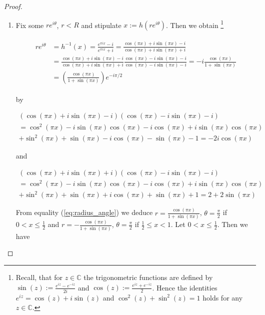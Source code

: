 \begin{proof}
\begin{enumerate}[label = \textbf{(\roman*)}]
\begin{enumerate}[label = \textbf{\alph*.}]
\item Fix some $re^{i\theta}$, $r < R$ and stipulate $x := h(re^{i\theta})$. Then we obtain \footnote{
		Recall, that for $z \in \mathbb{C}$ the trigonometric functions are defined by $\sin(z) := \frac{e^{iz} - e^{-iz}}{2i}$ and $\cos(z) := \frac{e^{iz} + e^{-iz}}{2}$. Hence the identities $e^{iz} = \cos(z) + i\sin(z)$ and $\cos^2(z) + \sin^2(z) = 1$ holds for any $z \in \mathbb{C}$.	
	}

	\begin{gather}
		\begin{aligned}
			re^{i\theta} &= h^{-1}(x) = \frac{e^{\pi i x}- i}{e^{\pi i x} + i} = \frac{\cos(\pi x) + i\sin(\pi x) - i}{\cos(\pi x) + i\sin(\pi x) + i}\\
			&= \frac{\cos(\pi x) + i\sin(\pi x) - i}{\cos(\pi x) + i\sin(\pi x) + i}\frac{\cos(\pi x) - i\sin(\pi x) - i}{\cos(\pi x) - i\sin(\pi x) - i} = -i \frac{\cos(\pi x)}{1 + \sin(\pi x)}\\
			&= \left( \frac{\cos(\pi x)}{1 + \sin(\pi x)} \right)e^{-i\pi/2}
		\end{aligned}
		\label{eq:radius_angle}
	\end{gather}

	by

	\begin{multline*}
			\left(\cos(\pi x) + i\sin(\pi x) - i\right)\left(\cos(\pi x) - i\sin(\pi x) - i\right)\\ = \cos^2(\pi x) - i\sin(\pi x)\cos(\pi x)	
			 -i\cos(\pi x) + i\sin(\pi x)\cos(\pi x)\\
			 + \sin^2(\pi x) + \sin(\pi x) - i \cos(\pi x) - \sin(\pi x) - 1 = -2i \cos(\pi x)  
	\end{multline*}

	and

	\begin{multline*}
		\left( \cos(\pi x) + i\sin(\pi x) + i \right)\left( \cos(\pi x) - i\sin(\pi x) - i \right)\\ = \cos^2(\pi x) - i\sin(\pi x)\cos(\pi x) - i\cos(\pi x) + i\sin(\pi x)\cos(\pi x)\\
		 + \sin^2(\pi x) + \sin(\pi x)+ i \cos(\pi x) + \sin(\pi x) + 1 = 2 + 2\sin(\pi x)
	\end{multline*}

	From equality (\ref{eq:radius_angle}) we deduce $r = \frac{\cos(\pi x)}{1 + \sin(\pi x)}$, $\theta = \frac{\pi}{2}$ if $0 < x \leqslant \frac{1}{2}$ and $r = -\frac{\cos(\pi x)}{1 + \sin(\pi x)}$, $\theta = \frac{\pi}{2}$ if $\frac{1}{2} \leqslant x < 1$. Let $0 < x \leqslant \frac{1}{2}$. Then we have


\end{enumerate}
\end{enumerate}
\end{proof}

